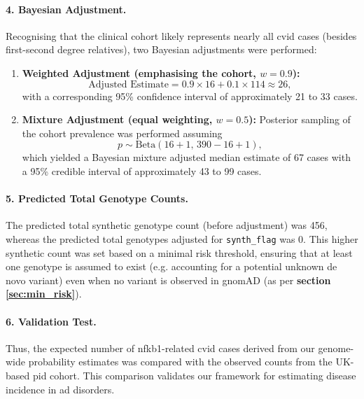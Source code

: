 \paragraph{4. Bayesian Adjustment.}
Recognising that the clinical cohort likely represents nearly all \ac{cvid} cases (besides first-second degree relatives), two Bayesian adjustments were performed:
\begin{enumerate}
  \item \textbf{Weighted Adjustment (emphasising the cohort, \(w=0.9\)):}
  \[
  \text{Adjusted Estimate} = 0.9 \times 16 + 0.1 \times 114 \approx 26,
  \]
  with a corresponding 95\% confidence interval of approximately 21 to 33 cases.
  
  \item \textbf{Mixture Adjustment (equal weighting, \(w=0.5\)):}  
  Posterior sampling of the cohort prevalence was performed assuming
  \[
  p \sim \mathrm{Beta}(16+1,\,390-16+1),
  \]
  which yielded a Bayesian mixture adjusted median estimate of 67 cases with a 95\% credible interval of approximately 43 to 99 cases.
\end{enumerate}

\paragraph{5. Predicted Total Genotype Counts.}
The predicted total synthetic genotype count (before adjustment) was 456, whereas the predicted total genotypes adjusted for \texttt{synth\_flag} was 0. This higher synthetic count was set based on a minimal risk threshold, ensuring that at least one genotype is assumed to exist (e.g. accounting for a potential unknown de novo variant) even when no variant is observed in gnomAD (as per \textbf{section
\ref{sec:min_risk}}).

\paragraph{6. Validation Test.}
Thus, the expected number of \ac{nfkb1}-related \ac{cvid} cases derived from our genome-wide probability estimates was compared with the observed counts from the UK-based \ac{pid} cohort. This comparison validates our framework for estimating disease incidence in \ac{ad} disorders.


